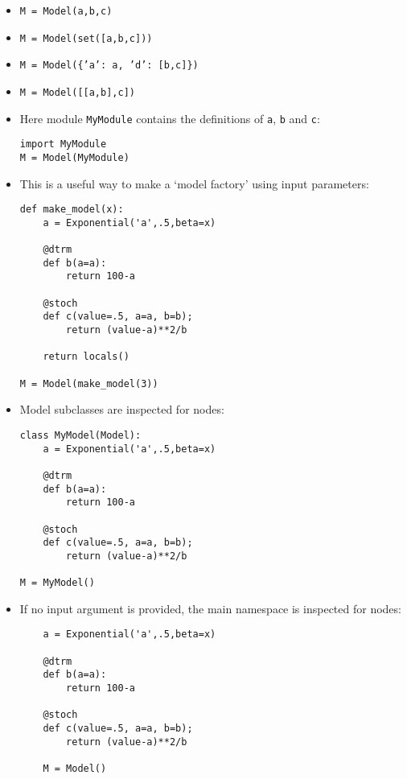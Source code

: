 \begin{itemize}
    \item \texttt{M = Model(a,b,c)}
    \item \texttt{M = Model(set([a,b,c]))}
    \item \texttt{M = Model(\{'a': a, 'd': [b,c]\})}
    \item \texttt{M = Model([[a,b],c])}
    \item Here module \texttt{MyModule} contains the definitions of \texttt{a}, \texttt{b} and \texttt{c}:\begin{verbatim}
import MyModule
M = Model(MyModule)
    \end{verbatim}
    \item This is a useful way to make a `model factory' using input parameters:
    \begin{verbatim}
def make_model(x):
    a = Exponential('a',.5,beta=x)
    
    @dtrm
    def b(a=a):
        return 100-a
    
    @stoch
    def c(value=.5, a=a, b=b);
        return (value-a)**2/b
        
    return locals()
    
M = Model(make_model(3))
    \end{verbatim}
    \item Model subclasses are inspected for nodes:
    \begin{verbatim}
class MyModel(Model):
    a = Exponential('a',.5,beta=x)

    @dtrm
    def b(a=a):
        return 100-a

    @stoch
    def c(value=.5, a=a, b=b);
        return (value-a)**2/b        
        
M = MyModel()
    \end{verbatim}    
    \item If no input argument is provided, the main namespace is inspected for nodes:
    \begin{verbatim}
    a = Exponential('a',.5,beta=x)

    @dtrm
    def b(a=a):
        return 100-a

    @stoch
    def c(value=.5, a=a, b=b);
        return (value-a)**2/b        
    
    M = Model()
    \end{verbatim}

\end{itemize}

